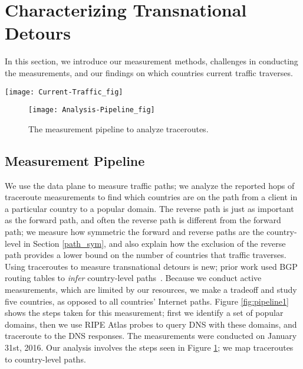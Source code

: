 \section{Characterizing Transnational Detours}
\label{datasets}
In this section, we introduce our measurement methods, challenges in conducting the measurements, and our findings on which countries current traffic traverses.

\begin{figure*}[ht]
\centering
\texttt{[image: Current-Traffic\_fig]}
\caption{The measurement pipeline to study current traffic routes.}
\label{fig:pipeline1}
\end{figure*}

\begin{figure}
\centering
\texttt{[image: Analysis-Pipeline\_fig]}
\caption{The measurement pipeline to analyze traceroutes.}
\label{fig:analysis_pipeline}
\end{figure}

\subsection{Measurement Pipeline}
\label{pipeline}
We use the data plane to measure traffic paths; we analyze the reported hops of traceroute measurements to find which countries are on the path from a client in a particular country to a popular domain.  The reverse path is just as important as the forward path, and often the reverse path is different from the forward path; we measure how symmetric the forward and reverse paths are the country-level in Section \ref{path_sym}, and also explain how the exclusion of the reverse path provides a lower bound on the number of countries that traffic traverses.  Using traceroutes to measure transnational detours is new; prior work used BGP routing tables to \textit{infer} country-level paths~\cite{karlin2009nation}.  Because we conduct active measurements, which are limited by our resources, we make a tradeoff and study five countries, as opposed to all countries' Internet paths.  Figure \ref{fig:pipeline1} shows the steps taken for this measurement; first we identify a set of popular domains, then we use RIPE Atlas probes to query DNS with these domains, and traceroute to the DNS responses.  The measurements were conducted on January 31st, 2016.  Our analysis involves the steps seen in Figure \ref{fig:analysis_pipeline}; we map traceroutes to country-level paths.

